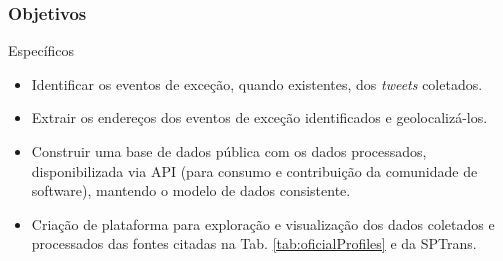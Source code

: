 \documentclass{beamer}
\begin{document}
\begin{frame}
\frametitle{Objetivos}
\begin{block}{Específicos}
\begin{itemize}
    \item Identificar os eventos de exceção, quando existentes, dos \textit{tweets} coletados.
     \item Extrair os endereços dos eventos de exceção identificados e geolocalizá-los.
		\item Construir uma base de dados pública com os dados processados, disponibilizada via API (para consumo e contribuição da comunidade de software), mantendo o modelo de dados consistente.
\item Criação de plataforma para exploração e visualização dos dados coletados e processados das fontes citadas na Tab. \ref{tab:oficialProfiles} e da SPTrans.
\end{itemize}
\end{block}
\end{frame}
\end{document}
